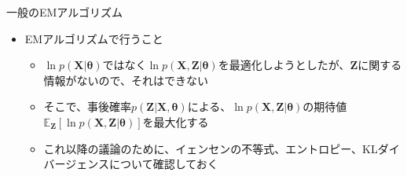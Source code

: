 \documentclass[dvipdfmx,notheorems,t]{beamer}
\begin{document}
\begin{frame}{一般のEMアルゴリズム}
\begin{itemize}
	\item EMアルゴリズムで行うこと
	\begin{itemize}
		\item $\ln p(\bm{X} | \bm{\theta})$ではなく$\ln p(\bm{X}, \bm{Z} | \bm{\theta})$を最適化しようとしたが、$\bm{Z}$に関する情報がないので、それはできない
		\item そこで、事後確率$p(\bm{Z} | \bm{X}, \bm{\theta})$による、$\ln p(\bm{X}, \bm{Z} | \bm{\theta})$の期待値$\mathbb{E}_{\bm{Z}} \left[ \ln p(\bm{X}, \bm{Z} | \bm{\theta}) \right]$を最大化する
		\newline
		\item これ以降の議論のために、\alert{イェンセンの不等式}、\alert{エントロピー}、\alert{KLダイバージェンス}について確認しておく
	\end{itemize}
\end{itemize}

\end{frame}
\end{document}

